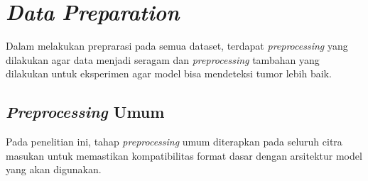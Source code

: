 \section{\textit{Data} \textit{Preparation}}
Dalam melakukan preprarasi pada semua dataset, terdapat \textit{preprocessing} yang dilakukan agar data menjadi seragam dan  \textit{preprocessing} tambahan yang dilakukan untuk eksperimen agar model bisa mendeteksi tumor lebih baik. 

\subsection{\textit{Preprocessing} Umum}
Pada penelitian ini, tahap \textit{preprocessing} umum diterapkan pada seluruh citra masukan 
untuk memastikan kompatibilitas format dasar dengan arsitektur model yang akan digunakan.
